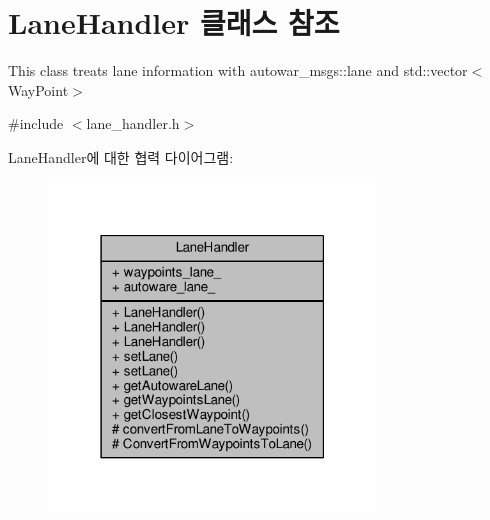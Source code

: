 \hypertarget{class_lane_handler}{}\section{Lane\+Handler 클래스 참조}
\label{class_lane_handler}


This class treats lane information with autowar\+\_\+msgs\+::lane and std\+::vector$<$\+Way\+Point$>$  




{\ttfamily \#include $<$lane\+\_\+handler.\+h$>$}



Lane\+Handler에 대한 협력 다이어그램\+:\nopagebreak
\begin{figure}[H]
\begin{center}
\leavevmode
\includegraphics[width=247pt]{class_lane_handler__coll__graph}
\end{center}
\end{figure}
